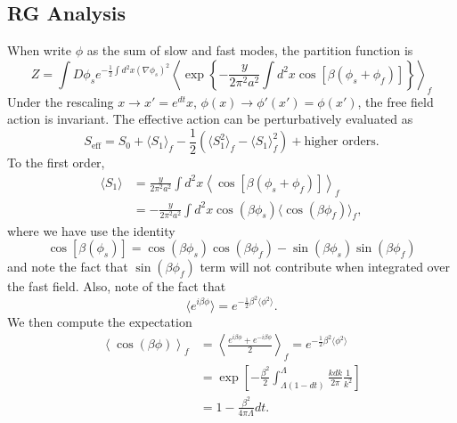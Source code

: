 \subsection{RG Analysis}
When write $\phi$ as the sum of slow and fast modes, the partition function is
\begin{equation}
	Z = \int D\phi_s e^{-\frac{1}{2}\int d^2x (\nabla\phi_s)^2}
	\left\langle\exp\left\{-\frac{y}{2\pi^2 a^2} \int d^2 x \cos\left[\beta(\phi_s+\phi_f)\right] \right\}\right\rangle_f
\end{equation}
Under the rescaling $x \rightarrow x' = e^{dt} x$, $\phi(x) \rightarrow \phi'(x') = \phi(x')$, the free field action is invariant.
The effective action can be perturbatively evaluated as
\begin{equation}
	S_{\mathrm{eff}} = S_0 + \langle S_1\rangle_f - \frac{1}{2}(\langle S_1^2\rangle_f - \langle S_1\rangle_f^2) + \text{higher orders}.
\end{equation}
To the first order, 
\begin{equation}
\begin{aligned}
	\langle S_1\rangle &= \frac{y}{2\pi^2 a^2} \int d^2 x \left\langle\cos\left[\beta(\phi_s+\phi_f)\right] \right\rangle_f \\
	&= -\frac{y}{2\pi^2 a^2} \int d^2 x \cos(\beta\phi_s)\langle\cos(\beta\phi_f)\rangle_f,
\end{aligned}
\end{equation}
where we have use the identity
\begin{equation}
	\cos\left[\beta(\phi_s)\right]
	= \cos(\beta\phi_s)\cos(\beta\phi_f)-\sin(\beta\phi_s)\sin(\beta\phi_f)
\end{equation}
and note the fact that $\sin(\beta\phi_f)$ term will not contribute when integrated over the fast field. 
Also, note of the fact that
\begin{equation}
	\langle e^{i\beta\phi}\rangle = e^{-\frac{1}{2}\beta^2 \langle\phi^2\rangle}.
\end{equation}
We then compute the expectation
\begin{equation}
\begin{aligned}
	\left\langle \cos(\beta\phi)\right\rangle_f
	&= \left\langle \frac{e^{i\beta\phi} + e^{-i\beta\phi}}{2}\right\rangle_f
	= e^{-\frac{1}{2}\beta^2\langle\phi^2\rangle} \\
	&= \exp\left[-\frac{\beta^2}{2}\int^\Lambda_{\Lambda(1-dt)}\frac{k dk}{2\pi} \frac{1}{k^2} \right] \\
	&= 1-\frac{\beta^2}{4\pi\Lambda}dt.
\end{aligned}
\end{equation}
